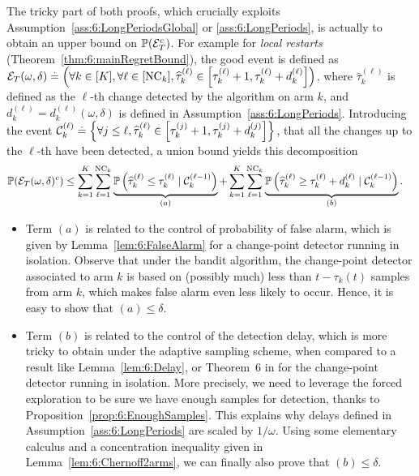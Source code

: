 The tricky part of both proofs, which crucially exploits Assumption~\ref{ass:6:LongPeriodsGlobal} or \ref{ass:6:LongPeriods}, is actually to obtain an upper bound on $\mathbb{P}(\mathcal{E}_T^c)$. For example for \emph{local restarts} (Theorem~\ref{thm:6:mainRegretBound}), the good event is defined as
$\mathcal{E}_T(\omega,\delta) \overset{.}{=} \left(\forall k \in [K], \forall \ell \in [\text{NC}_k], \widehat{\tau}^{(\ell)}_k \in \left[\tau_k^{(\ell)} + 1, \tau_k^{(\ell)} + d_k^{(\ell)}\right] \right)$,
%
where $\widehat{\tau}_k^{(\ell)}$ is defined as the $\ell$-th change detected by the algorithm on arm $k$, and $d_k^{(\ell)} = d_k^{(\ell)}(\omega,\delta)$ is defined in Assumption~\ref{ass:6:LongPeriods}.
Introducing the event
$\mathcal{C}_k^{(\ell)} \overset{.}{=} \left\{\forall j \leq \ell, \widehat{\tau}_k^{(\ell)} \in \left[\tau_k^{(j)} + 1, \tau_k^{(j)} + d_k^{(j)} \right] \right\}$,
that all the changes up to the $\ell$-th have been detected, a union bound yields this decomposition
%
\begin{align}
    \mathbb{P}(\mathcal{E}_T(\omega,\delta)^c) & \leq \sum\limits_{k=1}^K\sum\limits_{\ell=1}^{\text{NC}_k} \underbrace{\mathbb{P}\left(\widehat{\tau}_k^{(\ell)} \leq \tau_k^{(\ell)} \;|\; \mathcal{C}_k^{(\ell-1)}\right)}_{(a)} + \sum\limits_{k=1}^K\sum\limits_{\ell=1}^{\text{NC}_k} \underbrace{\mathbb{P}\left(\widehat{\tau}_k^{(\ell)} \geq \tau_k^{(\ell)} + d_k^{(\ell)} \;|\; \mathcal{C}_k^{(\ell-1)}\right)}_{(b)}.
\end{align}

\begin{itemize}
\item
Term $(a)$ is related to the control of probability of false alarm, which is given by Lemma~\ref{lem:6:FalseAlarm} for a change-point detector running in isolation.
Observe that under the bandit algorithm, the change-point detector associated to arm $k$ is based on (possibly much) less than $t - \tau_k(t)$ samples from arm $k$, which makes false alarm even less likely to occur. Hence, it is easy to show that $(a) \leq \delta$.

\item
Term $(b)$ is related to the control of the detection delay, which is more tricky to obtain under the \GLRklUCB{} adaptive sampling scheme,
when compared to a result like Lemma~\ref{lem:6:Delay}, or Theorem~6 in \cite{Maillard2018GLR} for the change-point detector running in isolation.
%
More precisely, we need to leverage the forced exploration to be sure we have enough samples for detection, thanks to Proposition~\ref{prop:6:EnoughSamples}.
This explains why delays defined in Assumption~\ref{ass:6:LongPeriods} are scaled by $1/\omega$.
Using some elementary calculus and a concentration inequality given in Lemma~\ref{lem:6:Chernoff2arms}, we can finally also prove that $(b) \leq \delta$.
\end{itemize}

